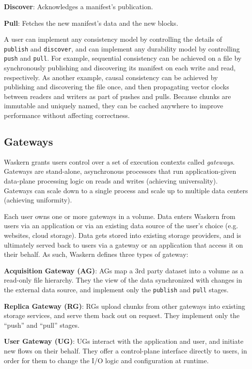 \textbf{Discover}: Acknowledges a manifest's publication.

\textbf{Pull}: Fetches the new manifest's data and the new blocks.

A user can implement any consistency model by controlling the details of
\texttt{publish} and \texttt{discover}, and can implement any durability model
by controlling \texttt{push} and \texttt{pull}. For example, sequential
consistency can be achieved on a file by synchronously publishing and
discovering its manifest on each write and read, respectively. As another
example, causal consistency can be achieved by publishing and discovering the
file once, and then propagating vector clocks between readers and writers as
part of pushes and pulls. Because chunks are immutable and uniquely named, they
can be cached anywhere to improve performance without affecting correctness.

\subsection{Gateways}

Waskern grants users control over a set of execution contexts called
\textit{gateways}. Gateways are stand-alone,
asynchronous processors that run application-given data-plane processing logic
on reads and writes (achieving universality). Gateways can scale down to a
single process and scale up to multiple data centers (achieving uniformity).

Each user owns one or more gateways in a volume. Data enters Waskern from
users via an application or via an existing data source of the user's choice
(e.g. websites, cloud storage). Data gets stored into existing storage
providers, and is ultimately served back to users via a gateway or an
application that access it on their behalf. As such, Waskern defines three
types of gateway:

\textbf{Acquisition Gateway (AG)}: AGs map a 3rd party dataset into a volume as a read-only
file hierarchy.  They the view of the data synchronized with changes in the
external data source, and implement only the \texttt{publish} and \texttt{pull}
stages.

\textbf{Replica Gateway (RG)}:   RGs upload chunks from other gateways into existing
storage services, and serve them back out on request. They implement only the
``push'' and ``pull'' stages.

\textbf{User Gateway (UG)}: UGs interact with the
application and user, and initiate new flows on their behalf. They offer a control-plane interface directly to
users, in order for them to change the I/O logic and configuration at runtime.

